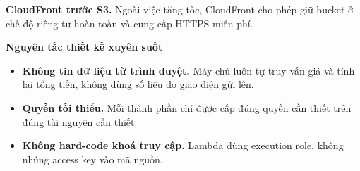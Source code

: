 \textbf{CloudFront trước S3.} Ngoài việc tăng tốc, CloudFront cho phép
giữ bucket ở chế độ riêng tư hoàn toàn và cung cấp HTTPS miễn phí.

\vspace{0.5em}\noindent\textbf{Nguyên tắc thiết kế xuyên
suốt}\par

\begin{itemize}
\tightlist
\item
  \textbf{Không tin dữ liệu từ trình duyệt.} Máy chủ luôn tự truy vấn
  giá và tính lại tổng tiền, không dùng số liệu do giao diện gửi lên.
\item
  \textbf{Quyền tối thiểu.} Mỗi thành phần chỉ được cấp đúng quyền cần
  thiết trên đúng tài nguyên cần thiết.
\item
  \textbf{Không hard-code khoá truy cập.} Lambda dùng execution role,
  không nhúng access key vào mã nguồn.
\end{itemize}
